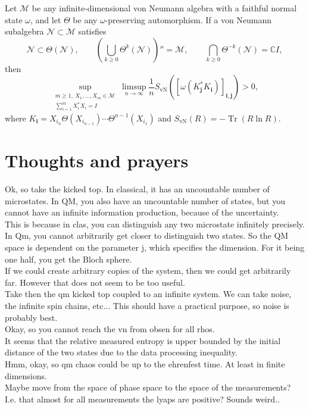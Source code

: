 \documentclass{article}
\begin{document}
Let $\mathcal M$ be any infinite-dimensional von Neumann algebra with a faithful normal state $\omega$, and let $\Theta$ be any $\omega$-preserving automorphism.
If a von Neumann subalgebra $\mathcal N\subset\mathcal M$ satisfies
\[
 \mathcal N\subset\Theta(\mathcal N),\qquad
 \left(\bigcup_{k\geq0}\Theta^k(\mathcal N)\right)''=\mathcal M,
 \qquad
 \bigcap_{k\geq0}\Theta^{-k}(\mathcal N)=\mathbb C I,
\]
then
\[
 \sup_{\substack{m\geq1,\ X_1,\ldots,X_m\in\mathcal M\\
                  \sum_{i=1}^{m}X_i^*X_i=I}}
 \limsup_{n\to\infty}\frac1n
 S_{\mathrm{vN}}\!\left(
   [\omega(K_{\mathbf j}^*K_{\mathbf i})]_{\mathbf i,\mathbf j}
 \right)>0,
\]
where $K_{\mathbf i}=X_{i_n}\Theta(X_{i_{n-1}})\cdots\Theta^{n-1}(X_{i_1})$ and $S_{\mathrm{vN}}(R)=-\operatorname{Tr}(R\ln R)$.
\section{Thoughts and prayers}
Ok, so take the kicked top. In classical, it has an uncountable number of microstates. In QM, you also have an uncountable number of states, but you cannot have an infinite information production, because of the uncertainty. \\
This is because in clas, you can distinguish any two microstate infinitely precisely. In Qm, you cannot arbitrarily get closer to distinguish two states. So the QM space is dependent on the parameter j, which specifies the dimension. For it being one half, you get the Bloch sphere. \\
If we could create arbitrary copies of the system, then we could get arbitrarily far. However that does not seem to be too useful. \\
Take then the qm kicked top coupled to an infinite system. We can take noise, the infinite spin chains, etc... This should have a practical purpose, so noise is probably best. \\
Okay, so you cannot reach the vn from obsen for all rhos. 
\\
It seems that the relative measured entropy is upper bounded by the initial distance of the two states due to the data processing inequality. \\
Hmm, okay, so qm chaos could be up to the ehrenfest time. At least in finite dimensions. \\
Maybe move from the space of phase space to the space of the measurements? I.e. that almost for all measurements the lyaps are positive? Sounds weird..\\
\end{document}
